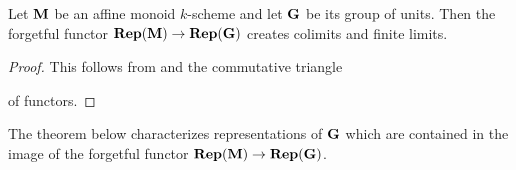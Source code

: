 \begin{fact}\label{fact:forgetful_from_reps_of_monoid_to_reps_of_units_creates_colimits_and_finite_limits}
Let $\mathbf{M}$ be an affine monoid $k$-scheme and let $\mathbf{G}$ be its group of units. Then the forgetful functor $\mathbf{Rep}(\mathbf{M})\rightarrow \mathbf{Rep}(\mathbf{G})$ creates colimits and finite limits.
\end{fact}
\begin{proof}
This follows from {\cite[Theorem 14.3, Theorem 14.4]{Monoid_k_functors}} and the commutative triangle
\begin{center}
\end{center}
of functors.
\end{proof}
\noindent
The theorem below characterizes representations of $\mathbf{G}$ which are contained in the image of the forgetful functor $\mathbf{Rep}(\mathbf{M})\rightarrow \mathbf{Rep}(\mathbf{G})$. 

